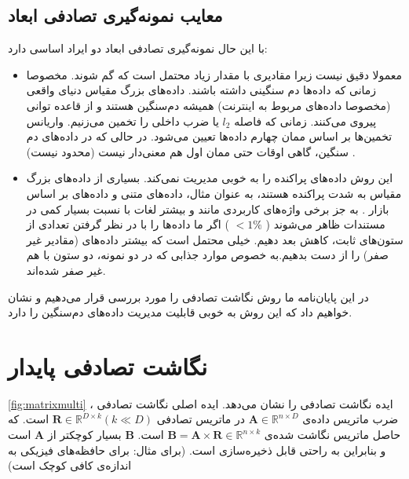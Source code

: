 \subsection{
معایب نمونه‌گیری تصادفی ابعاد
}
با این حال نمونه‌گیری تصادفی ابعاد دو ایراد اساسی دارد:
\begin{itemize}
\item
معمولا دقیق نیست زیرا مقادیری با مقدار زیاد محتمل است که گم شوند. مخصوصا زمانی که داده‌ها دم سنگینی داشته باشند. داده‌های بزرگ مقیاس دنیای واقعی (مخصوصا داده‌های مربوط به اینترنت) همیشه دم‌سنگین هستند و از قاعده توانی پیروی می‌کنند.
\cite{litez142,litez66, litez53, litez111}
زمانی که فاصله 
$l_2$
یا ضرب داخلی را تخمین می‌زنیم. واریانس تخمین‌ها بر اساس ممان چهارم داده‌ها تعیین می‌شود. در حالی که در داده‌های دم سنگین، گاهی اوقات حتی ممان اول هم معنی‌دار نیست (محدود نیست)
\cite{litez142}
.
\item
این روش داده‌های پراکنده را به خوبی مدیریت نمی‌کند. بسیاری از داده‌های بزرگ مقیاس به شدت پراکنده هستند، به عنوان مثال، داده‌های متنی 
\cite{litez60}
و داده‌های بر اساس بازار
\cite{litez7, litez158}
. به جز برخی واژه‌های کاربردی مانند 
 و 
بیشتر لغات با نسبت بسیار کمی در مستندات ظاهر می‌شوند (
$<1\%$
)
اگر ما داده‌ها را با در نظر گرفتن تعدادی از ستون‌های ثابت، کاهش بعد دهیم. خیلی محتمل است که بیشتر داده‌های (مقادیر غیر صفر) را از دست بدهیم.به خصوص موارد جذابی که در دو نمونه، دو ستون با هم غیر صفر شده‌اند.
\end{itemize}
در این پایان‌نامه ما روش نگاشت تصادفی را مورد بررسی قرار می‌دهیم و نشان خواهیم داد که این روش به خوبی قابلیت مدیریت داده‌های دم‌سنگین را دارد.

\section{نگاشت تصادفی پایدار}

\autoref{fig:matrixmulti}
، ایده نگاشت تصادفی را نشان می‌دهد. ایده اصلی نگاشت تصادفی ضرب ماتریس داده‌ی 
$\mathbf{A} \in \mathbb{R}^{n \times D}$
در ماتریس تصادفی 
$\mathbf{R} \in \mathbb{R}^{D \times k} (k \ll D)$
است. که حاصل ماتریس نگاشت شده‌ی 
$\mathbf{B} = \mathbf{A} \times \mathbf{R} \in \mathbb{R}^{n \times k}$
است. 
$\mathbf{B}$
بسیار کوچکتر از 
$\mathbf{A}$
است و بنابراین به راحتی قابل ذخیره‌سازی است. (برای مثال: برای حافظه‌های فیزیکی به اندازه‌ی کافی کوچک است)

